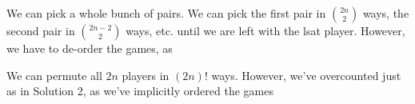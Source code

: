 \documentclass[11pt,twosided]{article}
\begin{document}
\begin{solution}{2}
We can pick a whole bunch of pairs. We can pick the first pair in $\binom{2n}{2}$ ways, the second pair in $\binom{2n-2}{2}$ ways, etc. until we are left with the lsat player. However, we have to de-order the games, as 
\end{solution}

\begin{solution}{3}
We can permute all $2n$ players in $(2n)!$ ways. However, we've overcounted just as in Solution 2, as we've implicitly ordered the games 
\end{solution}


\begin{problem}{4}
\end{problem}
\end{document}
